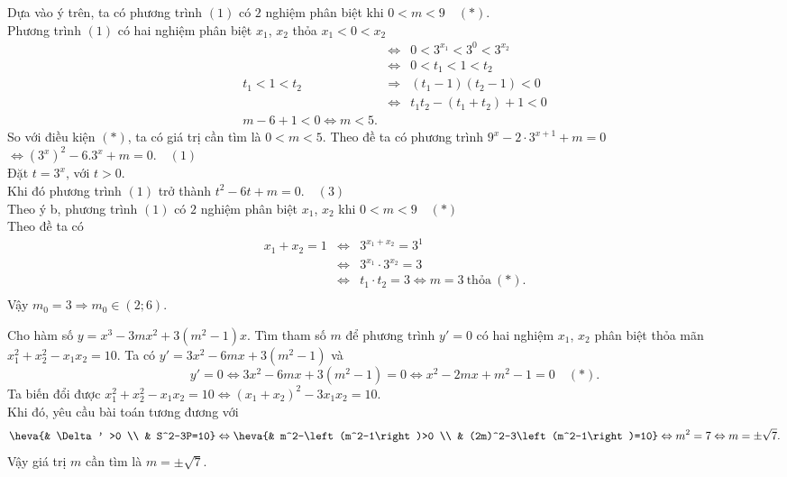 \begin{ex}
{\begin{itemchoice}
			 \itemch
			Dựa vào ý trên, ta có  phương trình $(1)$ có $2$ nghiệm phân biệt khi $0< m < 9\quad (*)$.\\
			Phương trình $(1)$ có hai nghiệm  phân biệt $x_1$, $x_2$ thỏa $x_1 < 0< x_2$
			\begin{eqnarray*}
				 &\Leftrightarrow & 0< 3^{x_1} < 3^0< 3^{x_2}\\
				&\Leftrightarrow & 0< t_1 < 1<  t_2\\
				t_1  < 1< t_2 &\Rightarrow & \left(t_1-1\right)\left(t_2-1\right) < 0\\
				&\Leftrightarrow & t_1 t_2-\left(t_1+t_2  \right)+1< 0\\
				m-6+1< 0\Leftrightarrow  m < 5.
			\end{eqnarray*}
			So với điều kiện $(*)$, ta có giá trị cần tìm là $0<  m < 5$.
			\itemch 
			Theo  đề ta có phương trình $9^x-2\cdot 3^{x+1}+m=0$ $\Leftrightarrow \left(3^x \right)^2-6.3^x+m=0.\quad(1)$ \\
			Đặt $t=3^x$, với $t >  0$.\\
			Khi đó phương trình $(1)$ trở thành  $t^2-6t+m=0.\quad(3)$\\
			Theo ý b, phương trình $(1)$ có $2$ nghiệm phân biệt $x_1$, $x_2$ khi  $0< m < 9\quad(*)$\\
			Theo đề  ta có
			\begin{eqnarray*}
				x_1+x_2=1 &\Leftrightarrow  &3^{x_1+x_2}=3^1\\
				&\Leftrightarrow & 3^{x_1}\cdot 3^{x_2}=3\\ 
				&\Leftrightarrow & t_1\cdot t_2=3\Leftrightarrow m=3~ \text{thỏa}~  (*).\\
			\end{eqnarray*}
			Vậy  $m_0=3\Rightarrow m_0 \in (2;6)$.
		\end{itemchoice}
	 }
\end{ex}

\begin{bt}%
	Cho hàm số $y=x^3-3mx^2+3\left(m^2-1\right)x$. Tìm tham số $m$ để phương trình $y'=0$ có hai nghiệm $x_1$, $x_2$ phân biệt thỏa mãn $x_1^2+x_2^2-x_1x_2=10$.
	\loigiai
	{Ta có $y'=3x^2-6mx+3\left(m^2-1\right)$ và $$y'=0\Leftrightarrow 3x^2-6mx+3\left(m^2-1\right)=0\Leftrightarrow x^2-2mx+m^2-1=0\quad (*).$$
		Ta biến đổi được $x_1^2+x_2^2-x_1x_2=10\Leftrightarrow \left(x_1+x_2\right)^2-3x_1x_2=10$.\\
		Khi đó, yêu cầu bài toán tương đương với
		\begin{eqnarray*}
			\heva{& \Delta' >0 \\ & S^2-3P=10}\Leftrightarrow\heva{& m^2-\left(m^2-1\right)>0 \\ & (2m)^2-3\left(m^2-1\right)=10}\Leftrightarrow m^2=7\Leftrightarrow m=\pm\sqrt{7}.
		\end{eqnarray*}
		Vậy giá trị $m$ cần tìm là $m=\pm\sqrt{7}$.
	}
\end{bt}

